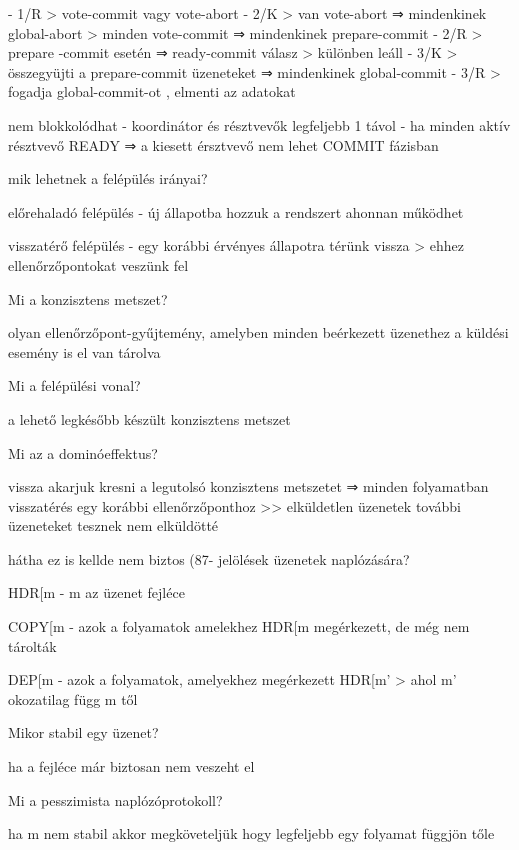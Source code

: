 \documentclass[12pt]{article}
\begin{document}
\begin{description}[style=unboxed]
        - 1/R
        > vote-commit vagy vote-abort
        - 2/K
        > van vote-abort ⇒ mindenkinek global-abort 
        > minden vote-commit ⇒ mindenkinek prepare-commit
        - 2/R
        > prepare -commit esetén ⇒ ready-commit válasz
        > különben leáll 
        - 3/K
        > összegyüjti a prepare-commit üzeneteket ⇒ mindenkinek global-commit
        - 3/R
        > fogadja global-commit-ot , elmenti az adatokat
    \item nem blokkolódhat
        - koordinátor és résztvevők legfeljebb 1 távol
        - ha minden aktív résztvevő READY ⇒ a kiesett érsztvevő nem lehet COMMIT fázisban
    \item  mik lehetnek a felépülés irányai?
    \item előrehaladó felépülés
        - új állapotba hozzuk a rendszert ahonnan működhet
    \item visszatérő felépülés
        - egy korábbi érvényes állapotra térünk vissza
        > ehhez ellenőrzőpontokat veszünk fel
    \item  Mi a konzisztens metszet?
    \item olyan ellenőrzőpont-gyűjtemény, amelyben minden beérkezett üzenethez a küldési esemény is el van tárolva
    \item  Mi a felépülési vonal?
    \item a lehető legkésőbb készült konzisztens metszet
    \item  Mi az a dominóeffektus?
    \item vissza akarjuk kresni a legutolsó konzisztens metszetet
        ⇒ minden folyamatban visszatérés egy korábbi ellenőrzőponthoz
        >> elküldetlen üzenetek további üzeneteket tesznek nem elküldötté
    \item hátha ez is kellde nem biztos (87-
        jelölések üzenetek naplózására?
    \item HDR[m 
        - m az üzenet fejléce 
    \item COPY[m
        - azok a folyamatok amelekhez HDR[m megérkezett, de még nem tárolták
    \item DEP[m
        - azok a folyamatok, amelyekhez megérkezett HDR[m' 
        > ahol m' okozatilag függ m től
    \item  Mikor stabil egy üzenet?
    \item ha a fejléce már biztosan nem veszeht el
    \item  Mi a pesszimista naplózóprotokoll?
    \item ha m nem stabil akkor megköveteljük hogy legfeljebb egy folyamat függjön tőle

\end{description}
\end{document}
